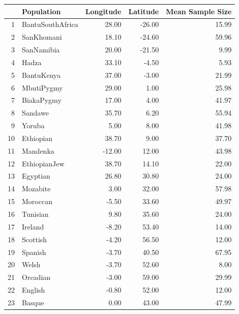 \documentclass[12pt]{article}
\begin{document}
 
 \begin{table}[ht]
 \tiny
\centering
\begin{tabular}{rlrrr}
  \hline
 & Population & Longitude & Latitude & Mean Sample Size \\ 
  \hline
1 & \textcolor{BantuSouthAfrica}{BantuSouthAfrica} & 28.00 & -26.00 & 15.99 \\ 
  2 & \textcolor{SanKhomani}{SanKhomani} & 18.10 & -24.60 & 59.96 \\ 
  3 & \textcolor{SanNamibia}{SanNamibia} & 20.00 & -21.50 & 9.99 \\ 
  4 & \textcolor{Hadza}{Hadza} & 33.10 & -4.50 & 5.93 \\ 
  5 & \textcolor{BantuKenya}{BantuKenya} & 37.00 & -3.00 & 21.99 \\ 
  6 & \textcolor{MbutiPygmy}{MbutiPygmy} & 29.00 & 1.00 & 25.98 \\ 
  7 & \textcolor{BiakaPygmy}{BiakaPygmy} & 17.00 & 4.00 & 41.97 \\ 
  8 & \textcolor{Sandawe}{Sandawe} & 35.70 & 6.20 & 55.94 \\ 
  9 & \textcolor{Yoruba}{Yoruba} & 5.00 & 8.00 & 41.98 \\ 
  10 & \textcolor{Ethiopian}{Ethiopian} & 38.70 & 9.00 & 37.70 \\ 
  11 & \textcolor{Mandenka}{Mandenka} & -12.00 & 12.00 & 43.98 \\ 
  12 & \textcolor{EthiopianJew}{EthiopianJew} & 38.70 & 14.10 & 22.00 \\ 
  13 & \textcolor{Egyptian}{Egyptian} & 26.80 & 30.80 & 24.00 \\ 
  14 & \textcolor{Mozabite}{Mozabite} & 3.00 & 32.00 & 57.98 \\ 
  15 & \textcolor{Moroccan}{Moroccan} & -5.50 & 33.60 & 49.97 \\ 
  16 & \textcolor{Tunisian}{Tunisian} & 9.80 & 35.60 & 24.00 \\ 
  17 & \textcolor{Ireland}{Ireland} & -8.20 & 53.40 & 14.00 \\ 
  18 & \textcolor{Scottish}{Scottish} & -4.20 & 56.50 & 12.00 \\ 
  19 & \textcolor{Spanish}{Spanish} & -3.70 & 40.50 & 67.95 \\ 
  20 & \textcolor{Welsh}{Welsh} & -3.70 & 52.60 & 8.00 \\ 
  21 & \textcolor{Orcadian}{Orcadian} & -3.00 & 59.00 & 29.99 \\ 
  22 & \textcolor{English}{English} & -0.80 & 52.00 & 12.00 \\ 
  23 & \textcolor{Basque}{Basque} & 0.00 & 43.00 & 47.99 \\ 

\end{tabular}
\end{table}
\end{document}

